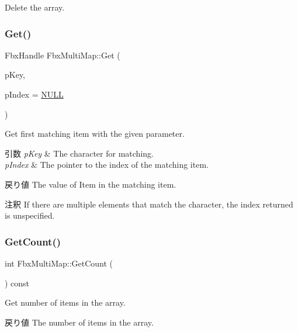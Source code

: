 Delete the array. 

\mbox{\label{class_fbx_multi_map_af0a42e2b8786d36bf7942318b9b89201}} 
\subsubsection{\texorpdfstring{Get()}{Get()}}
{\footnotesize\ttfamily Fbx\+Handle Fbx\+Multi\+Map\+::\+Get (\begin{DoxyParamCaption}\item[{Fbx\+Handle}]{p\+Key,  }\item[{int $\ast$}]{p\+Index = {\ttfamily \hyperlink{fbxarch_8h_a070d2ce7b6bb7e5c05602aa8c308d0c4}{N\+U\+LL}} }\end{DoxyParamCaption})}

Get first matching item with the given parameter. 
\begin{DoxyParams}{引数}
{\em p\+Key} & The character for matching. \\
\hline
{\em p\+Index} & The pointer to the index of the matching item. \\
\hline
\end{DoxyParams}
\begin{DoxyReturn}{戻り値}
The value of Item in the matching item. 
\end{DoxyReturn}
\begin{DoxyRemark}{注釈}
If there are multiple elements that match the character, the index returned is unspecified. 
\end{DoxyRemark}
\mbox{\label{class_fbx_multi_map_a5e496eeb0e6154087fd2259539c16782}} 
\subsubsection{\texorpdfstring{Get\+Count()}{GetCount()}}
{\footnotesize\ttfamily int Fbx\+Multi\+Map\+::\+Get\+Count (\begin{DoxyParamCaption}{ }\end{DoxyParamCaption}) const\hspace{0.3cm}{\ttfamily [inline]}}

Get number of items in the array. \begin{DoxyReturn}{戻り値}
The number of items in the array. 
\end{DoxyReturn}


